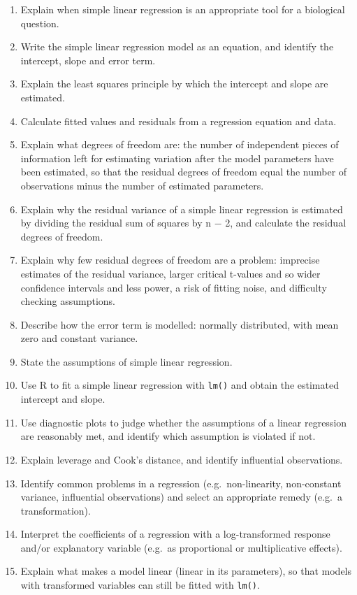 \documentclass[
  letterpaper,
  8pt,
  a4paper]{book}
\providecommand{\tightlist}{%
  \setlength{\itemsep}{0pt}\setlength{\parskip}{0pt}}
\begin{document}
\begin{tcolorbox}
\begin{enumerate}
\def\labelenumi{\arabic{enumi}.}
\tightlist
\item
  Explain when simple linear regression is an appropriate tool for a
  biological question.
\item
  Write the simple linear regression model as an equation, and identify
  the intercept, slope and error term.
\item
  Explain the least squares principle by which the intercept and slope
  are estimated.
\item
  Calculate fitted values and residuals from a regression equation and
  data.
\item
  Explain what degrees of freedom are: the number of independent pieces
  of information left for estimating variation after the model
  parameters have been estimated, so that the residual degrees of
  freedom equal the number of observations minus the number of estimated
  parameters.
\item
  Explain why the residual variance of a simple linear regression is
  estimated by dividing the residual sum of squares by n − 2, and
  calculate the residual degrees of freedom.
\item
  Explain why few residual degrees of freedom are a problem: imprecise
  estimates of the residual variance, larger critical t-values and so
  wider confidence intervals and less power, a risk of fitting noise,
  and difficulty checking assumptions.
\item
  Describe how the error term is modelled: normally distributed, with
  mean zero and constant variance.
\item
  State the assumptions of simple linear regression.
\item
  Use R to fit a simple linear regression with \texttt{lm()} and obtain
  the estimated intercept and slope.
\item
  Use diagnostic plots to judge whether the assumptions of a linear
  regression are reasonably met, and identify which assumption is
  violated if not.
\item
  Explain leverage and Cook's distance, and identify influential
  observations.
\item
  Identify common problems in a regression (e.g.~non-linearity,
  non-constant variance, influential observations) and select an
  appropriate remedy (e.g.~a transformation).
\item
  Interpret the coefficients of a regression with a log-transformed
  response and/or explanatory variable (e.g.~as proportional or
  multiplicative effects).
\item
  Explain what makes a model linear (linear in its parameters), so that
  models with transformed variables can still be fitted with
  \texttt{lm()}.
\end{enumerate}


\end{tcolorbox}
\end{document}

